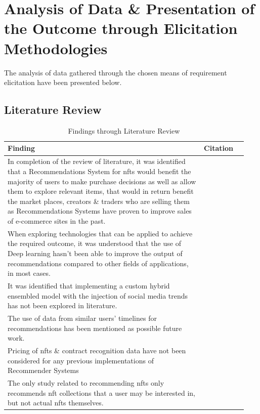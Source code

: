 \section{Analysis of Data \& Presentation of the Outcome through Elicitation Methodologies}
The analysis of data gathered through the chosen means of requirement elicitation have been presented below.

\pagebreak

\subsection{Literature Review}

\vspace{-4mm}       %

\begin{longtable}{|p{0.77\linewidth}|p{0.17\linewidth}|} 
\caption{Findings through Literature Review}
\label{tab:lr-findings-table}\\
\hline
\textbf{Finding} & \textbf{Citation} \\ 
\hline
In completion of the review of literature, it was identified that a Recommendations System for \gls{nft}s would benefit the majority of users to make purchase decisions as well as allow them to explore relevant items, that would in return benefit the market places, creators \& traders who are selling them as Recommendations Systems have proven to improve sales of e-commerce sites in the past. & \autocite{naumov_deep_2019, vanderbilt_science_nodate} \\ 
\hline
When exploring technologies that can be applied to achieve the required outcome, it was understood that the use of Deep learning hasn’t been able to improve the output of recommendations compared to other fields of applications, in most cases. & \autocite{choi_local_2021} \\
\hline
It was identified that implementing a custom hybrid ensembled model with the injection of social media trends has not been explored in literature. & \autocite{ayushi_cross-domain_2018, cheng_hybrid_2020} \\
\hline
The use of data from similar users’ timelines for recommendations has been mentioned as possible future work. & \autocite{chen_user_2019} \\
\hline
Pricing of \gls{nft}s \& contract recognition data have not been considered for any previous implementations of Recommender Systems & \autocite{noauthor_what_2020} \\
\hline
The only study related to recommending \gls{nft}s only recommends \gls{nft} collections that a user may be interested in, but not actual \gls{nft}s themselves. & \autocite{noauthor_what_2020} \\
\hline
\end{longtable}


